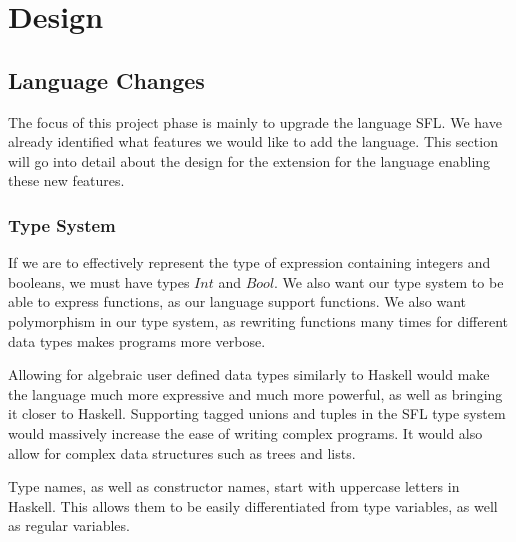 \section{Design}
\subsection{Language Changes}
The focus of this project phase is mainly to upgrade the language SFL. We have already identified what features we would like to add the language. This section will go into detail about the design for the extension for the language enabling these new features. 
\subsubsection{Type System}
\label{sec:type_system_design}
If we are to effectively represent the type of expression containing integers and booleans, we must have types $Int$ and $Bool$. We also want our type system to be able to express functions, as our language support functions. We also want polymorphism in our type system, as rewriting functions many times for different data types makes programs more verbose.  

Allowing for algebraic user defined data types similarly to Haskell would make the language much more expressive and much more powerful, as well as bringing it closer to Haskell. Supporting tagged unions and tuples in the \ac{SFL} type system would massively increase the ease of writing complex programs. It would also allow for complex data structures such as trees and lists. 

Type names, as well as constructor names,  start with uppercase letters in Haskell. This allows them to be easily differentiated from type variables, as well as regular variables.

